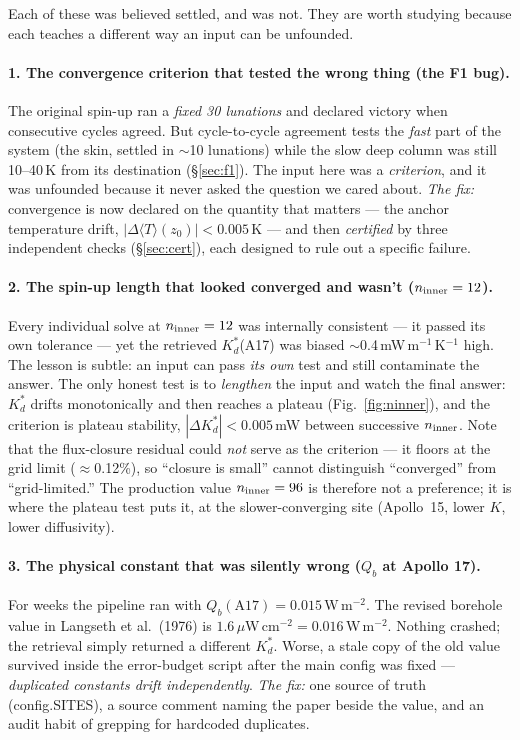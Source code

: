 \documentclass[11pt]{report}
\newcommand{\Tm}{\langle T\rangle}
\newcommand{\code}[1]{{\ttfamily\small #1}}
\begin{document}
Each of these was believed settled, and was not. They are worth studying
because each teaches a different way an input can be unfounded.

\paragraph{\textbf{1. The convergence criterion that tested the wrong thing
(the F1 bug).}} The original spin-up ran a \emph{fixed 30 lunations} and
declared victory when consecutive cycles agreed. But cycle-to-cycle agreement
tests the \emph{fast} part of the system (the skin, settled in $\sim$10
lunations) while the slow deep column was still 10--40\,K from its
destination (\S\ref{sec:f1}). The input here was a \emph{criterion}, and it
was unfounded because it never asked the question we cared about.
\emph{The fix:} convergence is now declared on the quantity that matters ---
the anchor temperature drift, $|\Delta\Tm(z_0)|<0.005$\,K --- and then
\emph{certified} by three independent checks (\S\ref{sec:cert}), each designed
to rule out a specific failure.

\paragraph{\textbf{2. The spin-up length that looked converged and wasn't
($n_{\rm inner}=12$).}} Every individual solve at $n_{\rm inner}=12$ was
internally consistent --- it passed its own tolerance --- yet the retrieved
$K_d^{*}$(A17) was biased $\sim$0.4\,mW\,m$^{-1}$\,K$^{-1}$ high. The lesson is
subtle: an input can pass \emph{its own} test and still contaminate the answer.
The only honest test is to \emph{lengthen} the input and watch the final answer:
$K_d^{*}$ drifts monotonically and then reaches a plateau
(Fig.~\ref{fig:ninner}), and the criterion is plateau stability,
$|\Delta K_d^{*}|<0.005$\,mW between successive $n_{\rm inner}$. Note that the
flux-closure residual could \emph{not} serve as the criterion --- it floors at
the grid limit ($\approx$0.12\%), so ``closure is small'' cannot distinguish
``converged'' from ``grid-limited.'' The production value $n_{\rm inner}=96$ is
therefore not a preference; it is where the plateau test puts it, at the
slower-converging site (Apollo~15, lower $K$, lower diffusivity).

\paragraph{\textbf{3. The physical constant that was silently wrong
($Q_b$ at Apollo 17).}} For weeks the pipeline ran with $Q_b(\mathrm{A17})=
0.015$\,W\,m$^{-2}$. The revised borehole value in Langseth et al.\ (1976) is
$1.6\,\mu$W\,cm$^{-2} = 0.016$\,W\,m$^{-2}$. Nothing crashed; the retrieval
simply returned a different $K_d^{*}$. Worse, a stale copy of the old value
survived inside the error-budget script after the main config was fixed ---
\emph{duplicated constants drift independently}. \emph{The fix:} one source of
truth (\code{config.SITES}), a source comment naming the paper beside the
value, and an audit habit of grepping for hardcoded duplicates.
\end{document}
